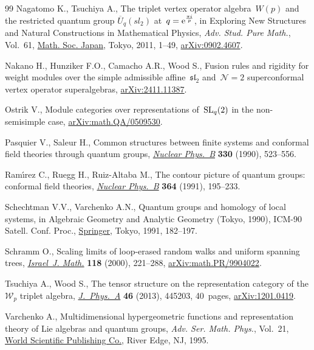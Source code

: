 \begin{thebibliography}{99}
Nagatomo K., Tsuchiya A., The triplet vertex operator algebra~{$W(p)$} and the
 restricted quantum group {$\overline U_q(sl_2)$} at~{$q={\rm e}^{\frac{\pi
 i}{p}}$}, in Exploring {N}ew {S}tructures and {N}atural {C}onstructions in
 {M}athematical {P}hysics, \textit{Adv. Stud. Pure Math.}, Vol.~61,
 \href{https://doi.org/10.2969/aspm/06110001}{Math. Soc. Japan}, Tokyo, 2011,
 1--49, \href{http://arxiv.org/abs/0902.4607}{arXiv:0902.4607}.

Nakano H., Hunziker F.O., Camacho A.R., Wood S., Fusion rules and rigidity for
 weight modules over the simple admissible affine~$\mathfrak{sl}_{2}$
 and~${\mathcal{N}=2}$ superconformal vertex operator superalgebras,
 \href{http://arxiv.org/abs/2411.11387}{arXiv:2411.11387}.

Ostrik V., Module categories over representations of~${{\rm SL}_q (2)}$ in the
 non-semisimple case,
 \href{http://arxiv.org/abs/math.QA/0509530}{arXiv:math.QA/0509530}.

Pasquier V., Saleur H., Common structures between finite systems and conformal
 field theories through quantum groups,
 \href{https://doi.org/10.1016/0550-3213(90)90122-T}{\textit{Nuclear Phys.~B}}
 \textbf{330} (1990), 523--556.

Ram\'{\i}rez C., Ruegg H., Ruiz-Altaba M., The contour picture of quantum
 groups: conformal field theories,
 \href{https://doi.org/10.1016/0550-3213(91)90583-J}{\textit{Nuclear Phys.~B}}
 \textbf{364} (1991), 195--233.

Schechtman V.V., Varchenko A.N., Quantum groups and homology of local systems,
 in Algebraic {G}eometry and {A}nalytic {G}eometry ({T}okyo, 1990), ICM-90
 Satell. Conf. Proc.,
 \href{https://doi.org/10.1007/978-4-431-68172-4_10}{Springer}, Tokyo, 1991,
 182--197.

Schramm O., Scaling limits of loop-erased random walks and uniform spanning
 trees, \href{https://doi.org/10.1007/BF02803524}{\textit{Israel~J. Math.}}
 \textbf{118} (2000), 221--288,
 \href{http://arxiv.org/abs/math.PR/9904022}{arXiv:math.PR/9904022}.

Tsuchiya A., Wood S., The tensor structure on the representation category of
 the {$\mathcal{W}_p$} triplet algebra,
 \href{https://doi.org/10.1088/1751-8113/46/44/445203}{\textit{J.~Phys.~A}}
 \textbf{46} (2013), 445203, 40~pages,
 \href{http://arxiv.org/abs/1201.0419}{arXiv:1201.0419}.

Varchenko A., Multidimensional hypergeometric functions and representation
 theory of {L}ie algebras and quantum groups, \textit{Adv. Ser. Math. Phys.},
 Vol.~21, \href{https://doi.org/10.1142/2467}{World Scientific Publishing Co.},
 River Edge, NJ, 1995.

\end{thebibliography}
